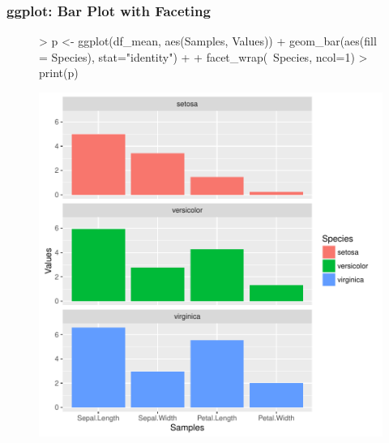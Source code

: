 \documentclass{beamer}
\begin{document}
\begin{frame}[containsverbatim]  
	\frametitle{ggplot: Bar Plot with Faceting}
\scriptsize 
\begin{figure}
  \centering
\begin{Schunk}
\begin{Sinput}
> p <- ggplot(df_mean, aes(Samples, Values)) + geom_bar(aes(fill = Species), stat="identity") + 
+             facet_wrap(~Species, ncol=1)
> print(p) 
\end{Sinput}
\end{Schunk}
\includegraphics{fig--059}
\label{fig:qplotscatter}
\end{figure}
\end{frame}
\end{document}
